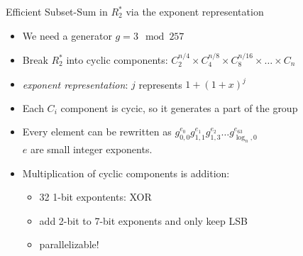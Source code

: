 \documentclass[10pt]{beamer}
\begin{document}
\begin{frame}{Efficient Subset-Sum in $R_2^*$ via the exponent representation}
  \begin{itemize}
    \item We need a generator $g=3 \mod 257$
       \item Break $R_2^*$ into cyclic components: 
         $C_2^{n/4} \times C_4^{n/8} \times C_8^{n/16} \times \ldots
         \times  C_n$\pause
       \item \emph{exponent representation}: $j$ represents $1+(1+x)^j$\pause
       \item Each $C_i$ component is cycic, so it generates a part of the group\pause
       \item Every element can be rewritten as
         $g_{0,0}^{e_0}g_{1,1}^{e_1}g_{1,3}^{e_2}\ldots g_{\log_n,0}^{e_63}$\\ 
         $e$ are small integer exponents. \pause
       \item Multiplication of cyclic components is addition: 
         \begin{itemize}
           \item 32 1-bit expontents: XOR
           \item add 2-bit to 7-bit exponents and only keep LSB\pause
           \item parallelizable!
         \end{itemize}
     \end{itemize}
 \end{frame}
\end{document}
